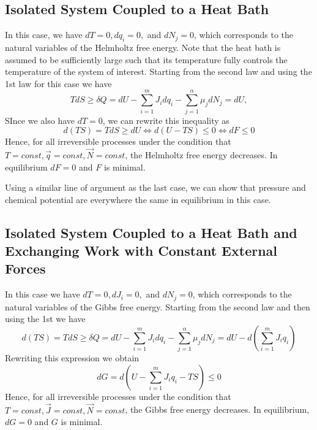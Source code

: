 \documentclass[12pt, a4paper, oneside, openright, titlepage]{book}
\begin{document}
\subsection{Isolated System Coupled to a Heat Bath}

In this case, we have $dT = 0, dq_i = 0,$ and $dN_j = 0$, which corresponds to the natural variables of the Helmholtz free energy. Note that the heat bath is assumed to be sufficiently large such that its temperature fully controls the temperature of the system of interest. Starting from the second law and using the 1st law for this case we have \begin{equation*}
    TdS \geq \delta Q = dU - \sum_{i=1}^mJ_idq_i - \sum_{j=1}^{\alpha}\mu_jdN_j = dU,
\end{equation*}
SInce we also have $dT = 0$, we can rewrite this inequality as \begin{equation*}
    d(TS) = TdS \geq dU \iff d(U-TS) \leq 0 \iff dF \leq 0
\end{equation*}
Hence, for all irreversible processes under the condition that $T = const, \vec{q} = const, \vec{N} = const$, the Helmholtz free energy decreases. In equilibrium $dF = 0$ and $F$ is minimal.

Using a similar line of argument as the last case, we can show that pressure and chemical potential are everywhere the same in equilibrium in this case.

\subsection{Isolated System Coupled to a Heat Bath and Exchanging Work with Constant External Forces}

In this case we have $dT = 0, dJ_i = 0,$ and $dN_j = 0$, which corresponds to the natural variables of the Gibbs free energy. Starting from the second law and then using the 1st we have \begin{equation*}
    d(TS) = TdS \geq \delta Q = dU - \sum_{i=1}^mJ_idq_i - \sum_{j=1}^{\alpha}\mu_jdN_j = dU - d\left(\sum_{i=1}^mJ_iq_i\right)
\end{equation*}
Rewriting this expression we obtain \begin{equation*}
    dG = d\left(U - \sum_{i=1}^mJ_iq_i - TS\right) \leq 0
\end{equation*}
Hence, for all irreversible processes under the condition that $T = const, \vec{J} = const, \vec{N} = const$, the Gibbs free energy decreases. In equilibrium, $dG = 0$ and $G$ is minimal.
\end{document}
